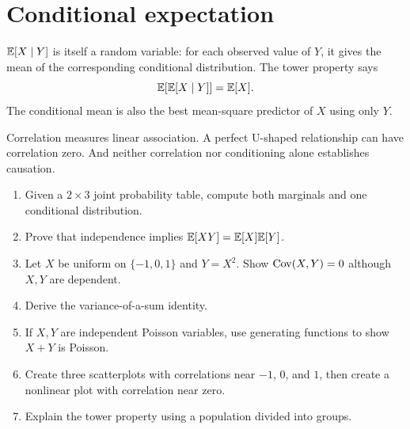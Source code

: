 \section{Conditional expectation}

$\mathbb E[X\mid Y]$ is itself a random variable: for each observed value of $Y$, it gives the mean of the corresponding conditional distribution. The tower property says
\[
\mathbb E[\mathbb E[X\mid Y]]=\mathbb E[X].
\]
The conditional mean is also the best mean-square predictor of $X$ using only $Y$.

\begin{warningbox}
Correlation measures linear association. A perfect U-shaped relationship can have correlation zero. And neither correlation nor conditioning alone establishes causation.
\end{warningbox}

\begin{exercisebox}
\begin{enumerate}
  \item Given a $2\times3$ joint probability table, compute both marginals and one conditional distribution. 
  \item Prove that independence implies $\mathbb E[XY]=\mathbb E[X]\mathbb E[Y]$. 
  \item Let $X$ be uniform on $\{-1,0,1\}$ and $Y=X^2$. Show $\operatorname{Cov}(X,Y)=0$ although $X,Y$ are dependent. 
  \item Derive the variance-of-a-sum identity. 
  \item If $X,Y$ are independent Poisson variables, use generating functions to show $X+Y$ is Poisson. 
  \item Create three scatterplots with correlations near $-1$, $0$, and $1$, then create a nonlinear plot with correlation near zero. 
  \item Explain the tower property using a population divided into groups. 
\end{enumerate}
\end{exercisebox}

